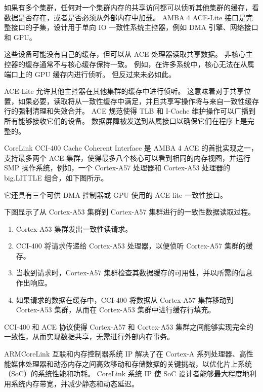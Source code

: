 如果有多个集群，任何对一个集群内存的共享访问都可以侦听其他集群的缓存，看数据是否存在，或者是否必须从外部内存中加载。
AMBA 4 ACE-Lite 接口是完整接口的子集，设计用于单向 IO 一致性系统主控器，例如 DMA 引擎、网络接口和 GPU。

这些设备可能没有自己的缓存，但可以从 ACE 处理器读取共享数据。
非核心主控器的缓存通常不与核心缓存保持一致。
例如，在许多系统中，核心无法在从属端口上的 GPU 缓存内进行侦听。
但反过来未必如此。

ACE-Lite 允许其他主控器在其他集群的缓存中进行侦听。
这意味着对于共享位置，如果必要，读取将从一致性缓存中满足，并且共享写操作将与来自一致性缓存行的强制清理和失效合并。
ACE 规范使得 TLB 和 I-Cache 维护操作可以广播到所有能够接收它们的设备。
数据屏障被发送到从属接口以确保它们在程序上是完整的。

CoreLink CCI-400 Cache Coherent Interface 是 AMBA 4 ACE 的首批实现之一，支持最多两个 ACE 集群，使得最多八个核心可以看到相同的内存视图，并运行 SMP 操作系统，例如，一个 Cortex-A57 处理器和 Cortex-A53 处理器的 big.LITTLE 组合，如下图所示。


它还具有三个可供 DMA 控制器或 GPU 使用的 ACE-lite 一致性接口。

下图显示了从 Cortex-A53 集群到 Cortex-A57 集群进行的一致性数据读取过程。

\begin{enumerate}
\item
  Cortex-A53 集群发出一致性读请求。
\item
  CCI-400 将请求传递给 Cortex-A53 处理器，以便侦听 Cortex-A57 集群的缓存。
\item
  当收到请求时，Cortex-A57 集群检查其数据缓存的可用性，并以所需的信息作出响应。
\item
  如果请求的数据在缓存中，CCI-400 将数据从 Cortex-A57 集群移动到 Cortex-A53 集群，从而在 Cortex-A53 集群中进行缓存行填充。
\end{enumerate}


CCI-400 和 ACE 协议使得 Cortex-A57 和 Cortex-A53 集群之间能够实现完全的一致性，从而实现数据共享，无需进行外部内存事务。

ARMCoreLink 互联和内存控制器系统 IP 解决了在 Cortex-A 系列处理器、高性能媒体处理器和动态内存之间高效移动和存储数据的关键挑战，以优化片上系统（SoC）的系统性能和功耗。
CoreLink 系统 IP 使 SoC 设计者能够最大程度地利用系统内存带宽，并减少静态和动态延迟。


